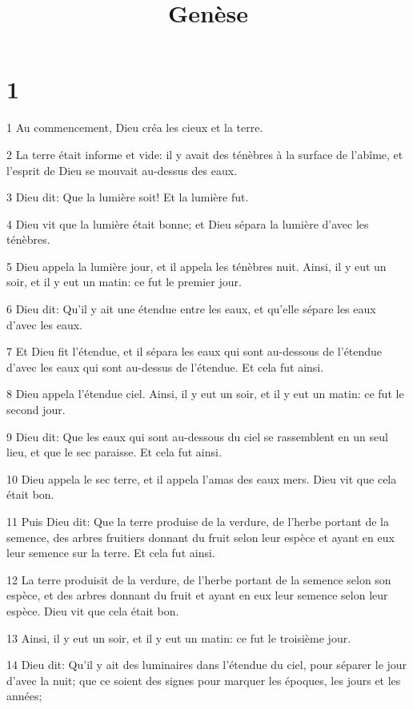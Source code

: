 

\title{Genèse}


\chapter{1}

\par 1 Au commencement, Dieu créa les cieux et la terre.
\par 2 La terre était informe et vide: il y avait des ténèbres à la surface de l'abîme, et l'esprit de Dieu se mouvait au-dessus des eaux.
\par 3 Dieu dit: Que la lumière soit! Et la lumière fut.
\par 4 Dieu vit que la lumière était bonne; et Dieu sépara la lumière d'avec les ténèbres.
\par 5 Dieu appela la lumière jour, et il appela les ténèbres nuit. Ainsi, il y eut un soir, et il y eut un matin: ce fut le premier jour.
\par 6 Dieu dit: Qu'il y ait une étendue entre les eaux, et qu'elle sépare les eaux d'avec les eaux.
\par 7 Et Dieu fit l'étendue, et il sépara les eaux qui sont au-dessous de l'étendue d'avec les eaux qui sont au-dessus de l'étendue. Et cela fut ainsi.
\par 8 Dieu appela l'étendue ciel. Ainsi, il y eut un soir, et il y eut un matin: ce fut le second jour.
\par 9 Dieu dit: Que les eaux qui sont au-dessous du ciel se rassemblent en un seul lieu, et que le sec paraisse. Et cela fut ainsi.
\par 10 Dieu appela le sec terre, et il appela l'amas des eaux mers. Dieu vit que cela était bon.
\par 11 Puis Dieu dit: Que la terre produise de la verdure, de l'herbe portant de la semence, des arbres fruitiers donnant du fruit selon leur espèce et ayant en eux leur semence sur la terre. Et cela fut ainsi.
\par 12 La terre produisit de la verdure, de l'herbe portant de la semence selon son espèce, et des arbres donnant du fruit et ayant en eux leur semence selon leur espèce. Dieu vit que cela était bon.
\par 13 Ainsi, il y eut un soir, et il y eut un matin: ce fut le troisième jour.
\par 14 Dieu dit: Qu'il y ait des luminaires dans l'étendue du ciel, pour séparer le jour d'avec la nuit; que ce soient des signes pour marquer les époques, les jours et les années;
